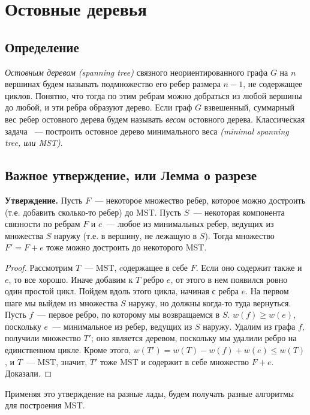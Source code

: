\documentclass[12pt]{article}
\renewcommand{\leq}{\leqslant}
\renewcommand{\geq}{\geqslant}
\begin{document}
\section{Остовные деревья}

\subsection{Определение}

\emph{Остовным деревом (spanning tree)} связного неориентированного графа $G$ на $n$ вершинах будем называть подмножество его ребер размера $n-1$, не содержащее циклов. 
Понятно, что тогда по этим ребрам можно добраться из любой вершины до любой, и эти ребра образуют дерево. Если граф $G$ взвешенный, суммарный 
вес ребер остовного дерева будем называть \emph{весом} остовного дерева. Классическая задача ~--- построить остовное дерево минимального веса \emph{(minimal spanning tree, или MST)}.

\subsection{Важное утверждение, или Лемма о разрезе}

\textbf{Утверждение.} Пусть $F$~--- некоторое множество ребер, которое можно достроить (т.е. добавить сколько-то ребер) до MST. Пусть $S$~--- некоторая компонента связности по ребрам $F$ и $e$~--- любое из минимальных ребер, ведущих из множества $S$ наружу (т.е. в вершину, не лежащую в $S$). Тогда множество $F' = F + e$ тоже можно достроить до некоторого MST.

\begin{proof}

Рассмотрим $T$~--- MST, cодержащее в себе $F$. Если оно содержит также и $e$, то все хорошо. Иначе добавим к $T$ ребро $e$, от этого в нем появился ровно один простой цикл. Пойдем вдоль этого цикла, начиная с ребра $e$. На первом шаге мы выйдем из множества $S$ наружу, но должны когда-то туда вернуться. Пусть $f$~--- первое ребро, по которому мы возвращаемся в $S$. $w(f) \geq w(e)$, поскольку $e$~--- минимальное из ребер, ведущих из $S$ наружу. Удалим из графа $f$, получили множество $T'$; оно является деревом, поскольку мы удалили ребро на единственном цикле. Кроме этого, $w(T') = w(T) - w(f) + w(e) \leq w(T)$, и $T$~--- MST, значит, $T'$ тоже MST и содержит в себе множество $F + e$. Доказали.

\end{proof}

Применяя это утверждение на разные лады, будем получать разные алгоритмы для построения MST.
\end{document}
